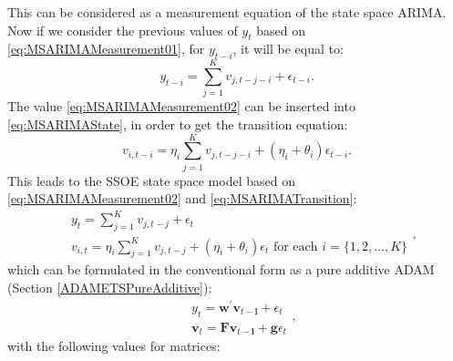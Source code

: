 \documentclass[]{book}
\theoremstyle{definition}
\theoremstyle{definition}
\theoremstyle{definition}
\theoremstyle{definition}
\theoremstyle{remark}
\begin{document}
This can be considered as a measurement equation of the state space ARIMA. Now if we consider the previous values of \(y_t\) based on \eqref{eq:MSARIMAMeasurement01}, for \(y_{t-i}\), it will be equal to:
\begin{equation}
  y_{t-i} = \sum_{j=1}^K v_{j,t-j-i} + \epsilon_{t-i} .
  \label{eq:MSARIMAMeasurement02}
\end{equation}
The value \eqref{eq:MSARIMAMeasurement02} can be inserted into \eqref{eq:MSARIMAState}, in order to get the transition equation:
\begin{equation}
  v_{i,t-i} = \eta_i \sum_{j=1}^K v_{j,t-j-i} + (\eta_i + \theta_i) \epsilon_{t-i}.
  \label{eq:MSARIMATransition}
\end{equation}
This leads to the SSOE state space model based on \eqref{eq:MSARIMAMeasurement02} and \eqref{eq:MSARIMATransition}:
\begin{equation}
  \begin{aligned}
    &{y}_{t} = \sum_{j=1}^K v_{j,t-j} + \epsilon_t \\
    &v_{i,t} = \eta_i \sum_{j=1}^K v_{j,t-j} + (\eta_i + \theta_i) \epsilon_{t} \text{ for each } i=\{1, 2, \dots, K \}
  \end{aligned},
  \label{eq:ADAMARIMAExpanded}
\end{equation}
which can be formulated in the conventional form as a pure additive ADAM (Section \ref{ADAMETSPureAdditive}):
\begin{equation*}
  \begin{aligned}
    &{y}_{t} = \mathbf{w}^\prime \mathbf{v}_{t-\mathbf{l}} + \epsilon_t \\
    &\mathbf{v}_{t} = \mathbf{F} \mathbf{v}_{t-\mathbf{l}} + \mathbf{g} \epsilon_t
  \end{aligned},
\end{equation*}
with the following values for matrices:
\end{document}
